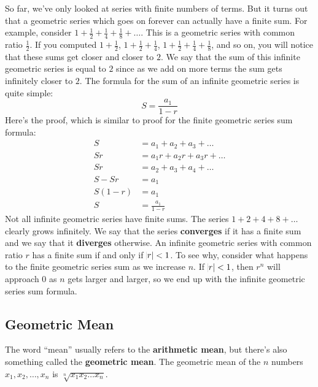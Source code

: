 \documentclass{article}
\begin{document}
\begin{multicols}{2}
        So far, we've only looked at series with finite numbers of terms. But it
        turns out that a geometric series which goes on forever can actually
        have a finite sum. For example, consider $1 + \frac{1}{2} + \frac{1}{4}
        + \frac{1}{8} + \dots$. This is a geometric series with common ratio
        $\frac{1}{2}$. If you computed $1 + \frac{1}{2}$, $1 + \frac{1}{2} +
        \frac{1}{4}$, $1 + \frac{1}{2} + \frac{1}{4} + \frac{1}{8}$, and so on,
        you will notice that these sums get closer and closer to $2$. We say
        that the sum of this infinite geometric series is equal to $2$ since as
        we add on more terms the sum gets infinitely closer to $2$. The formula
        for the sum of an infinite geometric series is quite simple:
        \[S = \frac{a_1}{1 - r}\] Here's the proof, which is similar to proof
        for the finite geometric series sum formula:
        \begin{align*}
            S &= a_1 + a_2 + a_3 + \dots \\
            Sr &= a_1 r + a_2 r + a_3 r + \dots \\
            Sr &= a_2 + a_3 + a_4 + \dots \\
            S - Sr &= a_1 \\
            S(1 - r) &= a_1 \\
            S &= \frac{a_1}{1 - r}
        \end{align*}
        Not all infinite geometric series have finite sums. The series $1 + 2 +
        4 + 8 + \dots$ clearly grows infinitely. We say that the series
        \textbf{converges} if it has a finite sum and we say that it
        \textbf{diverges} otherwise. An infinite geometric series with common
        ratio $r$ has a finite sum if and only if $\abs{r} < 1$. To see why,
        consider what happens to the finite geometric series sum as we increase
        $n$. If $\abs{r} < 1$, then $r^n$ will approach $0$ as $n$ gets larger
        and larger, so we end up with the infinite geometric series sum formula.

        \subsection*{Geometric Mean}
        The word ``mean'' usually refers to the \textbf{arithmetic mean}, but
        there's also something called the \textbf{geometric mean}. The geometric
        mean of the $n$ numbers $x_1, x_2, \dots, x_n$ is $\sqrt[n]{x_1 x_2
        \dots x_n}$.


\end{multicols}
\end{document}
